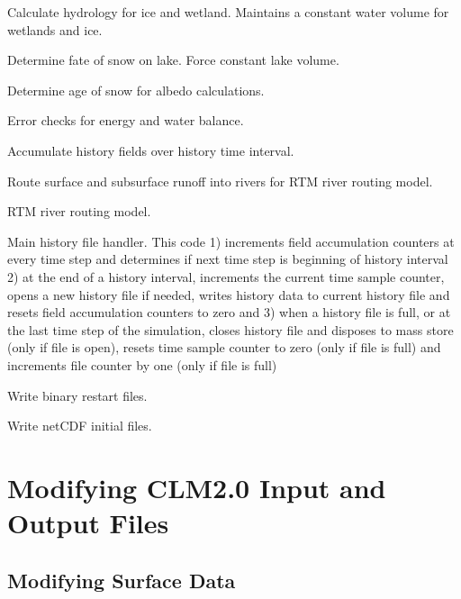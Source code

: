 \documentclass[]{article}
\begin{document}
Calculate hydrology for ice and wetland.  Maintains a constant water
volume for wetlands and ice. \newline

Determine fate of snow on lake. Force constant lake volume. \newline

Determine age of snow for albedo calculations. \newline

Error checks for energy and water balance. \newline

Accumulate history fields over history time interval. \newline

Route surface and subsurface runoff into rivers for RTM river routing
model. \newline

RTM river routing model. \newline

Main history file handler. This code 1) increments field accumulation
counters at every time step and determines if next time step is
beginning of history interval 2) at the end of a history interval,
increments the current time sample counter, opens a new history file
if needed, writes history data to current history file and resets field
accumulation counters to zero and 3) when a history file is full, or
at the last time step of the simulation, closes history file and
disposes to mass store (only if file is open), resets time sample
counter to zero (only if file is full) and increments file counter by
one (only if file is full) \newline

Write binary restart files. \newline

Write netCDF initial files. \newline

\section{Modifying CLM2.0 Input and Output Files}

\subsection {Modifying Surface Data}
\end{document}
